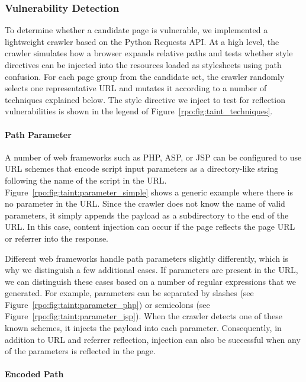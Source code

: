 \subsubsection{Vulnerability Detection}
\label{rpo:sec:methodology:vulnerable}

To determine whether a candidate page is vulnerable, we implemented a
lightweight crawler based on the Python Requests API. At a high level, the
crawler simulates how a browser expands relative paths and tests whether style
directives can be injected into the resources loaded as stylesheets using path
confusion. For each page group from the candidate set, the crawler randomly
selects one representative URL and mutates it according to a number of
techniques explained below. The style directive we inject to test for reflection
vulnerabilities is shown in the legend of Figure~\ref{rpo:fig:taint_techniques}.



\paragraph{Path Parameter}

A number of web frameworks such as PHP, ASP, or JSP can be configured to use URL
schemes that encode script input parameters as a directory-like string following
the name of the script in the URL. Figure~\ref{rpo:fig:taint:parameter_simple}
shows a generic example where there is no parameter in the URL. Since the
crawler does not know the name of valid parameters, it simply appends the
payload as a subdirectory to the end of the URL. In this case, content injection
can occur if the page reflects the page URL or referrer into the response.

Different web frameworks handle path parameters slightly differently, which is
why we distinguish a few additional cases. If parameters are present in the URL,
we can distinguish these cases based on a number of regular expressions that we
generated. For example, parameters can be separated by slashes (see
Figure~\ref{rpo:fig:taint:parameter_php}) or semicolons (see
Figure~\ref{rpo:fig:taint:parameter_jsp}). When the crawler detects one of these
known schemes, it injects the payload into each parameter. Consequently, in
addition to URL and referrer reflection, injection can also be successful when
any of the parameters is reflected in the page.

\paragraph{Encoded Path}

